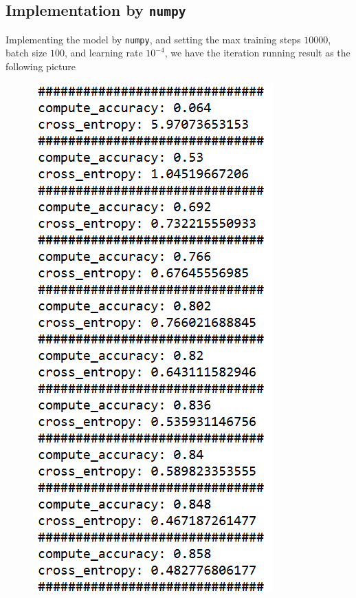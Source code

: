 \documentclass[10pt]{article}
\begin{document}
\subsection{Implementation by \texttt{numpy}}
Implementing the model by \texttt{numpy}, and setting the max training steps $10000$, batch size $100$, and learning rate $10^{-4}$, we have the iteration running result as the following picture
\begin{figure}[H]
\centering
\begin{minipage}[b]{0.45\textwidth}
\centering
\includegraphics[scale=.95]{fig1.png}
\label{fig1}
\end{minipage}
\
\begin{minipage}[b]{0.45\textwidth}
\centering

\end{minipage}
\end{figure}
\end{document}
